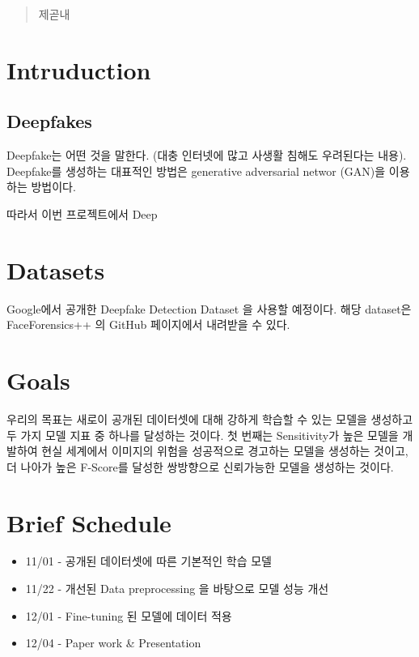 \documentclass{article}
\begin{document}
\begin{abstract}
제곧내
\end{abstract}

\section{Intruduction}

\subsection{Deepfakes}

Deepfake는 어떤 것을 말한다. (대충 인터넷에 많고 사생활 침해도 우려된다는 내용). Deepfake를 생성하는 대표적인 방법은 generative adversarial networ (GAN)을 이용하는 방법이다.

따라서 이번 프로젝트에서 Deep

\section{Datasets}

Google에서 공개한 Deepfake Detection Dataset \cite{DDD_GoogleJigSaw2019} 을 사용할 예정이다. 해당 dataset은 FaceForensics++ \cite{roessler2019faceforensicspp}의 GitHub 
페이지에서 내려받을 수 있다.

\section{Goals}

우리의 목표는 새로이 공개된 데이터셋에 대해 강하게 학습할 수 있는 모델을 생성하고 두 가지 모델 지표 중 하나를 달성하는 것이다. 첫 번째는 Sensitivity가 높은 모델을 개발하여 현실 세계에서 이미지의 위험을 성공적으로 경고하는 모델을 생성하는 것이고, 더 나아가 높은 F-Score를 달성한 쌍방향으로 신뢰가능한 모델을 생성하는 것이다.

\section{Brief Schedule}

\begin{itemize}
	\item 11/01 - 공개된 데이터셋에 따른 기본적인 학습 모델
	\item 11/22 - 개선된 Data preprocessing 을 바탕으로 모델 성능 개선
	\item 12/01 - Fine-tuning 된 모델에 데이터 적용
	\item 12/04 - Paper work \& Presentation
\end{itemize}
\end{document}

